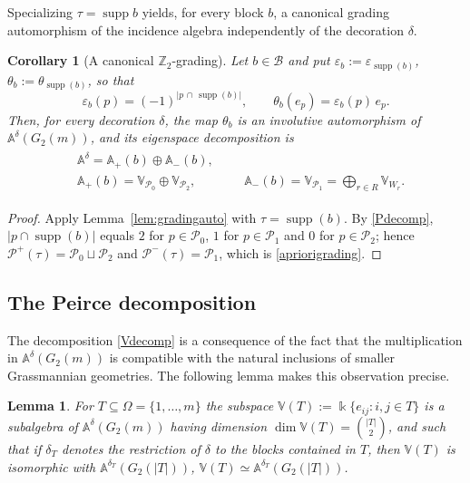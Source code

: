 \documentclass[times,11pt,reqno]{amsproc}
\newtheorem{lemma}[theorem]{Lemma}
\newtheorem{corollary}[theorem]{Corollary}
\theoremstyle{definition}
\numberwithin{equation}{section}
\newcommand\fie{\Bbbk}
\def\alg{\mathbb{A}}
\def\valg{\mathbb{V}}
\DeclareMathOperator{\supp}{supp}
\begin{document}
Specializing $\tau=\supp{b}$ yields, for every block $b$, a canonical grading automorphism of the incidence
algebra independently of the decoration $\delta$.

\begin{corollary}[A canonical $\mathbb Z_2$-grading]
\label{cor:gradingauto}
Let $b\in\mathcal B$ and put
$\varepsilon_b:=\varepsilon_{\supp(b)}$, $\theta_b:=\theta_{\supp(b)}$,
so that
\begin{equation}\label{epsilonmap}
\varepsilon_b(p)=(-1)^{|p\,\cap\,\supp(b)|},
\qquad
\theta_b(e_p)=\varepsilon_b(p)\,e_p .
\end{equation}
Then, for every decoration $\delta$, the map $\theta_b$ is an involutive
automorphism of $\alg^\delta(G_2(m))$, and its eigenspace decomposition
is
\begin{align}\label{apriorigrading}
\begin{aligned}
&\alg^\delta=\alg_{+}(b)\oplus\alg_{-}(b),\\
&\alg_{+}(b)=\valg_{\mathcal P_0}\oplus\valg_{\mathcal P_2},&&
&\alg_{-}(b)=\valg_{\mathcal P_1}=\bigoplus_{r\in R}\valg_{W_r} .
\end{aligned}
\end{align}
\end{corollary}

\begin{proof}
Apply Lemma~\ref{lem:gradingauto} with $\tau=\supp(b)$. By
\eqref{Pdecomp}, $|p\cap\supp(b)|$ equals $2$ for $p\in\mathcal P_0$,
$1$ for $p\in\mathcal P_1$ and $0$ for $p\in\mathcal P_2$; hence
$\mathcal P^{+}(\tau)=\mathcal P_0\sqcup\mathcal P_2$ and
$\mathcal P^{-}(\tau)=\mathcal P_1$, which is \eqref{apriorigrading}.
\end{proof}


\subsection{The Peirce decomposition}
The decomposition \eqref{Vdecomp} is  a consequence of the fact that the multiplication in $\alg^\delta(G_2(m))$ is compatible with the natural inclusions of smaller Grassmannian geometries. The following lemma makes this observation precise.

\begin{lemma}\label{lem:closure}
For $T\subseteq\Omega=\{1,\dots,m\}$ the subspace
$\valg(T):=\fie\{e_{ij}: i,j\in T\}$ is a subalgebra of $\alg^\delta(G_2(m))$ having dimension $
\dim \valg(T)=\binom{|T|}{2}$, and such that if $\delta_T$ denotes the restriction of $\delta$ to the blocks contained in $T$, then $\valg(T)$ is isomorphic with $\alg^{\delta_T}(G_2(|T|))$,
$\valg(T)\simeq\alg^{\delta_T}(G_2(|T|))$.
\end{lemma}
\end{document}
